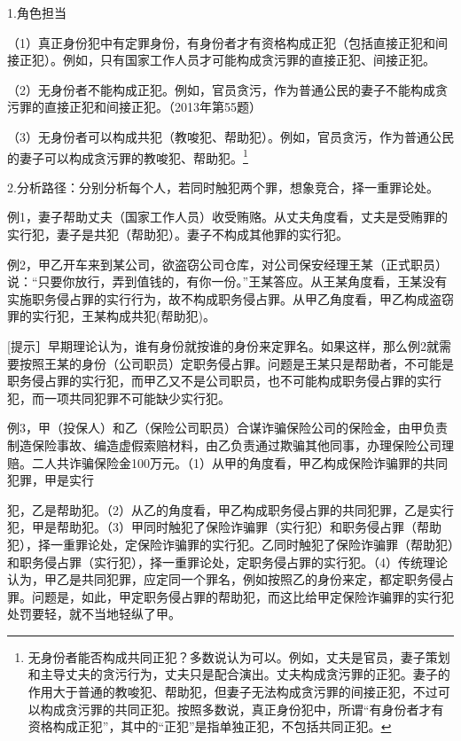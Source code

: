 1.角色担当

（1）真正身份犯中有定罪身份，有身份者才有资格构成正犯（包括直接正犯和间接正犯）。例如，只有国家工作人员才可能构成贪污罪的直接正犯、间接正犯。

（2）无身份者不能构成正犯。例如，官员贪污，作为普通公民的妻子不能构成贪污罪的直接正犯和间接正犯。（2013年第55题）

（3）无身份者可以构成共犯（教唆犯、帮助犯）。例如，官员贪污，作为普通公民的妻子可以构成贪污罪的教唆犯、帮助犯。\footnote{无身份者能否构成共同正犯？多数说认为可以。例如，丈夫是官员，妻子策划和主导丈夫的贪污行为，丈夫只是配合演出。丈夫构成贪污罪的正犯。妻子的作用大于普通的教唆犯、帮助犯，但妻子无法构成贪污罪的间接正犯，不过可以构成贪污罪的共同正犯。按照多数说，真正身份犯中，所谓“有身份者才有资格构成正犯”，其中的“正犯”是指单独正犯，不包括共同正犯。}

2.分析路径：分别分析每个人，若同时触犯两个罪，想象竞合，择一重罪论处。


例1，妻子帮助丈夫（国家工作人员）收受贿赂。从丈夫角度看，丈夫是受贿罪的实行犯，妻子是共犯（帮助犯）。妻子不构成其他罪的实行犯。

例2，甲乙开车来到某公司，欲盗窃公司仓库，对公司保安经理王某（正式职员）说：“只要你放行，弄到值钱的，有你一份。”王某答应。从王某角度看，王某没有实施职务侵占罪的实行行为，故不构成职务侵占罪。从甲乙角度看，甲乙构成盗窃罪的实行犯，王某构成共犯(帮助犯)。

[提示］早期理论认为，谁有身份就按谁的身份来定罪名。如果这样，那么例2就需要按照王某的身份（公司职员）定职务侵占罪。问题是王某只是帮助者，不可能是职务侵占罪的实行犯，而甲乙又不是公司职员，也不可能构成职务侵占罪的实行犯，而一项共同犯罪不可能缺少实行犯。

例3，甲（投保人）和乙（保险公司职员）合谋诈骗保险公司的保险金，由甲负责制造保险事故、编造虚假索赔材料，由乙负责通过欺骗其他同事，办理保险公司理赔。二人共诈骗保险金100万元。（1）从甲的角度看，甲乙构成保险诈骗罪的共同犯罪，甲是实行

犯，乙是帮助犯。（2）从乙的角度看，甲乙构成职务侵占罪的共同犯罪，乙是实行犯，甲是帮助犯。（3）甲同时触犯了保险诈骗罪（实行犯）和职务侵占罪（帮助犯），择一重罪论处，定保险诈骗罪的实行犯。乙同时触犯了保险诈骗罪（帮助犯）和职务侵占罪（实行犯），择一重罪论处，定职务侵占罪的实行犯。（4）传统理论认为，甲乙是共同犯罪，应定同一个罪名，例如按照乙的身份来定，都定职务侵占罪。问题是，如此，甲定职务侵占罪的帮助犯，而这比给甲定保险诈骗罪的实行犯处罚要轻，就不当地轻纵了甲。

